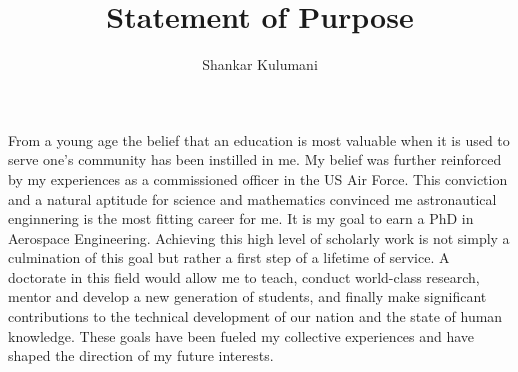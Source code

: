 \documentclass[12pt, oneside]{article}   	%
\title{Statement of Purpose}
\author{Shankar Kulumani}
\date{}							%
\begin{document}
\maketitle

\begin{comment}
On the first day of Astro 310, the introductory astronautics course at the US Air Force Academy, my professor asked bluntly, ``What have you learned so far?''
Some stated that they knew trigonometry; to which the professor replied `` Well, that brings you up to about the year 300 B.C.''
Another would reply that we had all learned calculus as well, which would be answered with another equally blunt statement of ``You're now all the way to about the 1700s.''
It was at this point where I finally realized that the wave of human knowledge continually moves forward and I want to lead it.
My goal is to obtain a PhD in Aerospace Engineering and attempt to contribute to the field in the same manner as all those who have come before me.
 \end{comment}

From a young age the belief that an education is most valuable when it is used to serve one’s community has been instilled in me. 
My  belief was further reinforced by my experiences as a commissioned officer in the US Air Force.
This conviction and a natural aptitude for science and mathematics convinced me astronautical enginnering is the most fitting career for me.
It is my goal to earn a PhD in Aerospace Engineering.
Achieving this high level of scholarly work is not simply a culmination of this goal but rather a first step of a lifetime of service. 
A doctorate in this field would allow me to teach, conduct world-class research, mentor and develop a new generation of students, and finally make significant contributions to the technical development of our nation and the state of human knowledge.
These goals have been fueled my collective experiences and have shaped the direction of my future interests.
\end{document}
